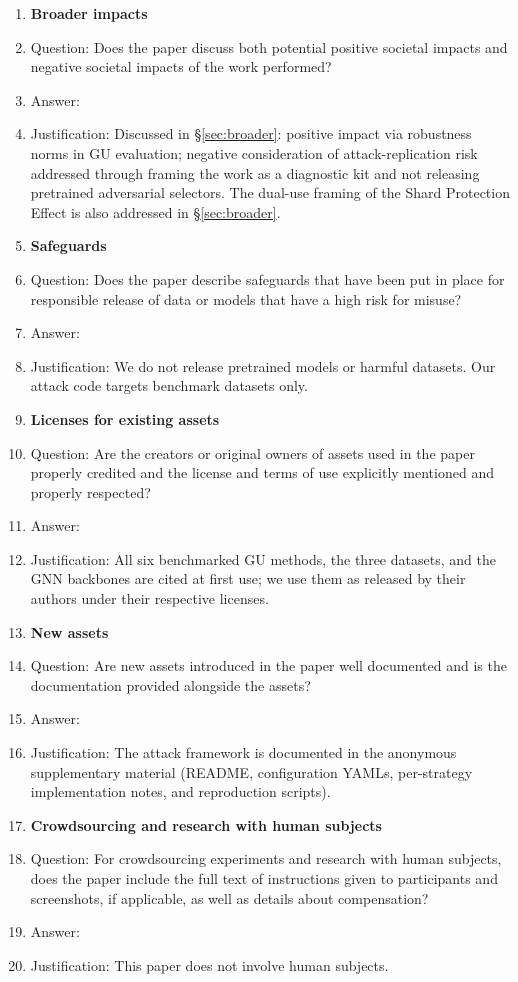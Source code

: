 \begin{enumerate}
\item {\bf Broader impacts}
    \item[] Question: Does the paper discuss both potential positive societal impacts and negative societal impacts of the work performed?
    \item[] Answer: \answerYes{}
    \item[] Justification: Discussed in \S\ref{sec:broader}: positive impact via robustness norms in GU evaluation; negative consideration of attack-replication risk addressed through framing the work as a diagnostic kit and not releasing pretrained adversarial selectors. The dual-use framing of the Shard Protection Effect is also addressed in \S\ref{sec:broader}.

\item {\bf Safeguards}
    \item[] Question: Does the paper describe safeguards that have been put in place for responsible release of data or models that have a high risk for misuse?
    \item[] Answer: \answerNA{}
    \item[] Justification: We do not release pretrained models or harmful datasets. Our attack code targets benchmark datasets only.

\item {\bf Licenses for existing assets}
    \item[] Question: Are the creators or original owners of assets used in the paper properly credited and the license and terms of use explicitly mentioned and properly respected?
    \item[] Answer: \answerYes{}
    \item[] Justification: All six benchmarked GU methods, the three datasets, and the GNN backbones are cited at first use; we use them as released by their authors under their respective licenses.

\item {\bf New assets}
    \item[] Question: Are new assets introduced in the paper well documented and is the documentation provided alongside the assets?
    \item[] Answer: \answerYes{}
    \item[] Justification: The attack framework is documented in the anonymous supplementary material (README, configuration YAMLs, per-strategy implementation notes, and reproduction scripts).

\item {\bf Crowdsourcing and research with human subjects}
    \item[] Question: For crowdsourcing experiments and research with human subjects, does the paper include the full text of instructions given to participants and screenshots, if applicable, as well as details about compensation?
    \item[] Answer: \answerNA{}
    \item[] Justification: This paper does not involve human subjects.


\end{enumerate}
